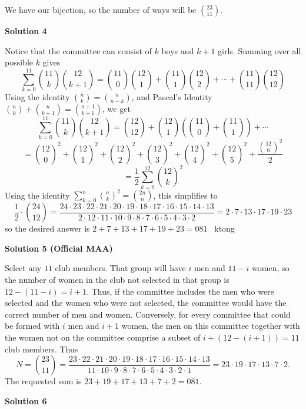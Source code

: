 \begin{enumerate}
 We have our bijection, so the number of ways will be $\binom{23}{11}$.

 



\textbf{Solution 4}

Notice that the committee can consist of $k$ boys and $k+1$ girls. Summing over all possible $k$ gives 
 \[\sum_{k=0}^{11}\binom{11}{k}\binom{12}{k+1}=\binom{11}{0}\binom{12}{1}+\binom{11}{1}\binom{12}{2}+\cdots + \binom{11}{11}\binom{12}{12}\]Using the identity $\binom{n}{k}=\binom{n}{n-k}$, and Pascal's Identity $\binom{n}{k}+\binom{n}{k+1}=\binom{n+1}{k+1}$, we get
 \[\sum_{k=0}^{11}\binom{11}{k}\binom{12}{k+1}=\binom{12}{12}+\binom{12}{1}\left(\binom{11}{0}+\binom{11}{1}\right)+\cdots\]
 \[=\binom{12}{0}^2+\binom{12}{1}^2+\binom{12}{2}^2+\binom{12}{3}^2+\binom{12}{4}^2+\binom{12}{5}^2+\frac{\binom{12}{6}^2}{2}\]
 \[=\frac{1}{2}\sum_{k=0}^{12}\binom{12}{k}^2\]Using the identity $\sum_{k=0}^n\binom{n}{k}^2=\binom{2n}{n}$, this simplifies to 
 \[\frac{1}{2}\cdot \binom{24}{12}=\frac{24\cdot 23\cdot 22\cdot 21\cdot 20\cdot 19\cdot 18\cdot 17\cdot 16\cdot 15\cdot 14\cdot 13}{2\cdot 12\cdot 11\cdot 10\cdot 9\cdot 8\cdot 7\cdot 6\cdot 5\cdot 4\cdot 3\cdot 2}=2\cdot 7\cdot 13\cdot 17\cdot 19\cdot 23\]so the desired answer is $2+7+13+17+19+23=\boxed{081}$ ~ktong

 



\textbf{Solution 5 (Official MAA)}

Select any $11$ club members. That group will have $i$ men and $11-i$ women, so the number of women in the club not selected in that group is $12 - (11-i) = i+1$. Thus, if the committee includes the men who were selected and the women who were not selected, the committee would have the correct number of men and women. Conversely, for every committee that could be formed with $i$ men and $i+1$ women, the men on this committee together with the women not on the committee comprise a subset of $i + (12 - (i+1)) = 11$ club members. Thus
 \[N = \binom{23}{11}= \frac{23\cdot22\cdot21\cdot20\cdot19\cdot18\cdot17\cdot16\cdot15\cdot14\cdot13}{11\cdot10\cdot9\cdot8\cdot7\cdot6\cdot5\cdot4\cdot3\cdot2\cdot1}=23\cdot19\cdot17\cdot13\cdot7\cdot2.\]The requested sum is $23+19+17+13+7+2=\boxed{081}$.

 



\textbf{Solution 6}


\end{enumerate}

